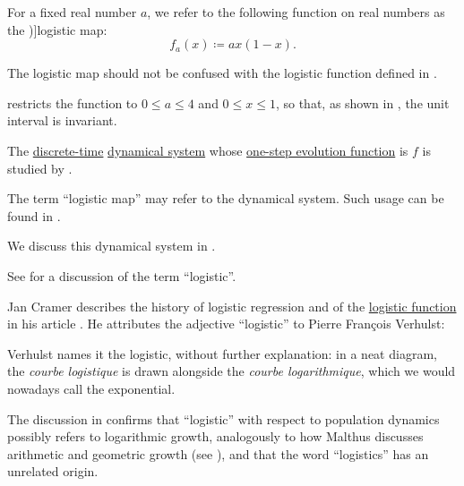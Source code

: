 \begin{definition}\label{def:logistic_map}\mimprovised
  For a fixed real number \( a \), we refer to the following function on real numbers as the \term[en=logistic map (\cite[22]{Müller2022HandbookOfDynamicsAndProbability})]{logistic map}:
  \begin{equation}\label{eq:def:logistic_map}
    f_a(x) \coloneqq a x (1 - x).
  \end{equation}
\end{definition}
\begin{comments}
  \item The logistic map should not be confused with the logistic function defined in .

  \item {} restricts the function to \( 0 \leq a \leq 4 \) and \( 0 \leq x \leq 1 \), so that, as shown in , the unit interval is invariant.

  The \hyperref[def:discrete_dynamical_system]{discrete-time} \hyperref[def:dynamical_system]{dynamical system} whose \hyperref[def:one_step_evolution_function]{one-step evolution function} is \( f \) is studied by .

  The term \enquote{logistic map} may refer to the dynamical system. Such usage can be found in \cite[353]{Strogatz1994NonlinearDynamics}.

  We discuss this dynamical system in .

  \item See  for a discussion of the term \enquote{logistic}.
\end{comments}

\begin{remark}\label{rem:logistic_model_etymology}
  Jan Cramer describes the history of logistic regression and of the \hyperref[def:logistic_function]{logistic function} in his article \cite{Cramer2003OriginsOfLogisticRegression}. He attributes the adjective \enquote{logistic} to Pierre Fran\c{c}ois Verhulst:
  \begin{displayquote}
    Verhulst names it the logistic, without further explanation: in a neat diagram, the \textit{courbe logistique} is drawn alongside the \textit{courbe logarithmique}, which we would nowadays call the exponential.
  \end{displayquote}

  The discussion in \cite{HSMSE:logistic_growth_etymology} confirms that \enquote{logistic} with respect to population dynamics possibly refers to logarithmic growth, analogously to how Malthus discusses arithmetic and geometric growth (see ), and that the word \enquote{logistics} has an unrelated origin.
\end{remark}

